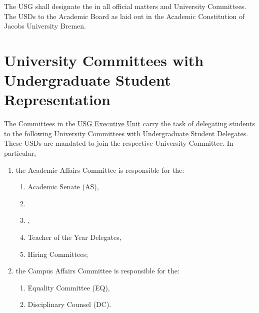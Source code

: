 
The USG shall designate the  in all official matters and University Committees. The USDs  to the Academic Board as laid out in the Academic Constitution of Jacobs University Bremen. 

\section{University Committees with Undergraduate Student Representation}
The Committees in the \hyperref[USGexecutiveUnitDef]{USG Executive Unit} carry the task of delegating students to the following University Committees with Undergraduate Student Delegates. These USDs are mandated to join the respective University Committee. In particular,
\begin{enumerate}
\item the Academic Affairs Committee is responsible for  the:
\begin{enumerate}
    \item Academic Senate (AS),
    \item {}
    \item {},
    \item Teacher of the Year Delegates,
    \item Hiring Committees;
\end{enumerate}
\item the Campus Affairs Committee is responsible for  the:
\begin{enumerate}
    \item Equality Committee (EQ),
    \item Disciplinary Counsel (DC).
\end{enumerate}
\end{enumerate}

